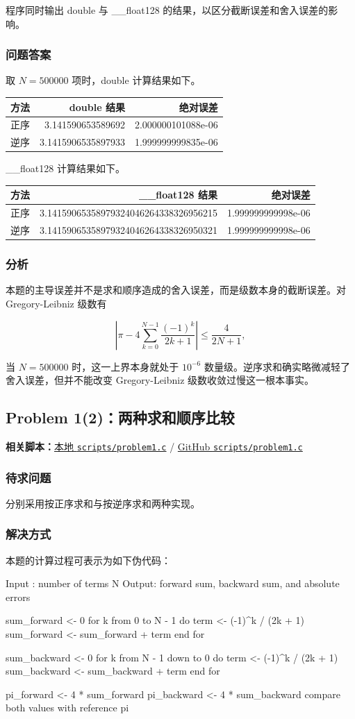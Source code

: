 \documentclass[12pt,a4paper,fontset=none]{ctexart}
\newcommand{\problem}[1]{\subsection{#1}}
\newcommand{\blocktitle}[1]{\subsubsection{#1}}
\newcommand{\codeinline}[1]{{\normalfont #1}}
\newcommand{\fileinline}[1]{{\urlstyle{same}\nolinkurl{#1}}}
\newcommand{\scriptpath}[1]{\fileinline{#1}}
\newcommand{\githubscriptsbase}{https://github.com/Void0312Aurora/computational-physics-homework-2026/blob/main/02/scripts}
\newcommand{\scriptlink}[1]{\noindent\textbf{相关脚本：}\href{../../../scripts/#1}{本地 \scriptpath{scripts/#1}} / \href{\githubscriptsbase/#1}{GitHub \scriptpath{scripts/#1}}\par\medskip}
\begin{document}
程序同时输出 \codeinline{double} 与 \codeinline{\_\_float128} 的结果，以区分截断误差和舍入误差的影响。

\blocktitle{问题答案}

取 \(N=500000\) 项时，\codeinline{double} 计算结果如下。

\begin{table}[H]
  \centering
  \begin{tabular}{lrr}
    \toprule
    方法 & \codeinline{double} 结果 & 绝对误差 \\
    \midrule
    正序 & 3.141590653589692 & 2.000000101088e-06 \\
    逆序 & 3.1415906535897933 & 1.999999999835e-06 \\
    \bottomrule
  \end{tabular}
\end{table}

\codeinline{\_\_float128} 计算结果如下。

\begin{table}[H]
  \centering
  \begin{tabular}{lrr}
    \toprule
    方法 & \codeinline{\_\_float128} 结果 & 绝对误差 \\
    \midrule
    正序 & 3.14159065358979324046264338326956215 & 1.999999999998e-06 \\
    逆序 & 3.14159065358979324046264338326950321 & 1.999999999998e-06 \\
    \bottomrule
  \end{tabular}
\end{table}

\blocktitle{分析}

本题的主导误差并不是求和顺序造成的舍入误差，而是级数本身的截断误差。对 Gregory-Leibniz 级数有

\[
\left|\pi-4\sum_{k=0}^{N-1}\frac{(-1)^k}{2k+1}\right|
\le \frac{4}{2N+1},
\]

当 \(N=500000\) 时，这一上界本身就处于 \(10^{-6}\) 数量级。逆序求和确实略微减轻了舍入误差，但并不能改变 Gregory-Leibniz 级数收敛过慢这一根本事实。

\problem{Problem 1(2)：两种求和顺序比较}

\scriptlink{problem1.c}

\blocktitle{待求问题}

分别采用按正序求和与按逆序求和两种实现。

\blocktitle{解决方式}

本题的计算过程可表示为如下伪代码：

\begin{CodeBlock}
Input : number of terms N
Output: forward sum, backward sum, and absolute errors

sum_forward <- 0
for k from 0 to N - 1 do
    term <- (-1)^k / (2k + 1)
    sum_forward <- sum_forward + term
end for

sum_backward <- 0
for k from N - 1 down to 0 do
    term <- (-1)^k / (2k + 1)
    sum_backward <- sum_backward + term
end for

pi_forward <- 4 * sum_forward
pi_backward <- 4 * sum_backward
compare both values with reference pi
\end{CodeBlock}
\end{document}
